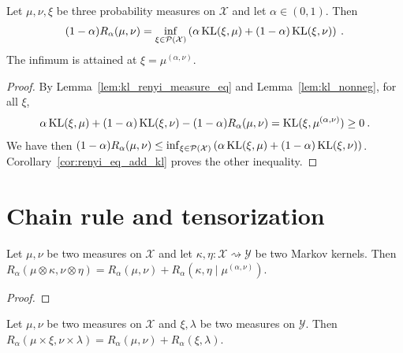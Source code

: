 \begin{lemma}
  \label{lem:renyi_eq_inf_add_kl}
  Let $\mu, \nu, \xi$ be three probability measures on $\mathcal X$ and let $\alpha \in (0, 1)$. Then
  \begin{align*}
  (1 - \alpha) R_\alpha(\mu, \nu) = \inf_{\xi \in \mathcal P(\mathcal X)}\left( \alpha \operatorname{KL}(\xi, \mu) + (1 - \alpha)\operatorname{KL}(\xi, \nu) \right) \: .
  \end{align*}
  The infimum is attained at $\xi = \mu^{(\alpha, \nu)}$.
\end{lemma}

\begin{proof}
By Lemma~\ref{lem:kl_renyi_measure_eq} and Lemma~\ref{lem:kl_nonneg}, for all $\xi$,
\begin{align*}
\alpha \operatorname{KL}(\xi, \mu) + (1 - \alpha)\operatorname{KL}(\xi, \nu) - (1 - \alpha) R_\alpha(\mu, \nu)
= \operatorname{KL}(\xi, \mu^{(\alpha, \nu)})
\ge 0 \: .
\end{align*}
We have then $(1 - \alpha) R_\alpha(\mu, \nu) \le \inf_{\xi \in \mathcal P(\mathcal X)}\left( \alpha \operatorname{KL}(\xi, \mu) + (1 - \alpha)\operatorname{KL}(\xi, \nu) \right)$.
Corollary~\ref{cor:renyi_eq_add_kl} proves the other inequality.
\end{proof}

\section{Chain rule and tensorization}

\begin{theorem}
  \label{thm:renyi_chain_rule}
  Let $\mu, \nu$ be two measures on $\mathcal X$ and let $\kappa, \eta : \mathcal X \rightsquigarrow \mathcal Y$ be two Markov kernels.
  Then $R_\alpha(\mu \otimes \kappa, \nu \otimes \eta) = R_\alpha(\mu, \nu) + R_\alpha(\kappa, \eta \mid \mu^{(\alpha, \nu)})$.
\end{theorem}

\begin{proof}
\end{proof}

\begin{corollary}
  \label{cor:renyi_prod_two}
  Let $\mu, \nu$ be two measures on $\mathcal X$ and $\xi, \lambda$ be two measures on $\mathcal Y$.
  Then $R_\alpha(\mu \times \xi, \nu \times \lambda) = R_\alpha(\mu, \nu) + R_\alpha(\xi, \lambda)$.
\end{corollary}

